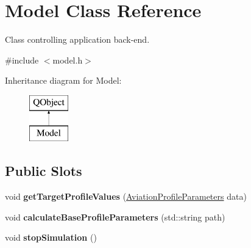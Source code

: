\hypertarget{class_model}{}\section{Model Class Reference}
\label{class_model}


Class controlling application back-\/end.  




{\ttfamily \#include $<$model.\+h$>$}

Inheritance diagram for Model\+:\begin{figure}[H]
\begin{center}
\leavevmode
\includegraphics[height=2.000000cm]{class_model}
\end{center}
\end{figure}
\subsection*{Public Slots}
\begin{DoxyCompactItemize}
\item 
\hypertarget{class_model_a61c13cae7083b057b444fcf40494e8c9}{}\label{class_model_a61c13cae7083b057b444fcf40494e8c9} 
void {\bfseries get\+Target\+Profile\+Values} (\hyperlink{struct_aviation_profile_parameters}{Aviation\+Profile\+Parameters} data)
\item 
\hypertarget{class_model_a3c060dfaec8c6d145356f6126f2859c4}{}\label{class_model_a3c060dfaec8c6d145356f6126f2859c4} 
void {\bfseries calculate\+Base\+Profile\+Parameters} (std\+::string path)
\item 
\hypertarget{class_model_a6452e846a5e560220236b7a59f1dd84b}{}\label{class_model_a6452e846a5e560220236b7a59f1dd84b} 
void {\bfseries stop\+Simulation} ()
\end{DoxyCompactItemize}
